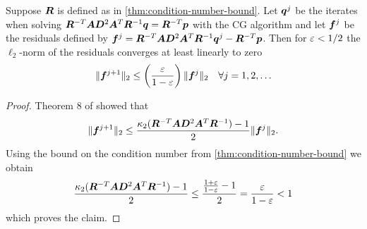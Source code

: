 \begin{theorem} \label{thm:cg-residual-bound}
Suppose \(\bm{R}\) is defined as in \cref{thm:condition-number-bound}.
Let \(\bm{q}^j\) be the iterates when solving \( \bm{R}^{-T} \bm{A} \bm{D}^2 \bm{A}^T \bm{R}^{-1} \bm{q} = \bm{R}^{-T} \bm{p} \) with the CG algorithm and let \(\bm{f}^j\) be the residuals defined by
\( \bm{f}^j = \bm{R}^{-T} \bm{A} \bm{D}^2 \bm{A}^T \bm{R}^{-1} \bm{q}^j - \bm{R}^{-T} \bm{p} \).
Then for \(\varepsilon < 1/2\) the \(\ell_2\)-norm of the residuals converges at least linearly to zero
\[ \lVert \bm{f}^{j+1} \rVert_2 \leq \left( \frac{\varepsilon}{1-\varepsilon} \right) \lVert  \bm{f}^j  \rVert_2 \quad \forall j = 1, 2, \ldots \]
\end{theorem}
\begin{proof}
Theorem 8 of \cite{Bouyouli-ConjugateGradientConvergence} showed that
\[ \lVert \bm{f}^{j+1} \rVert_2 \leq \frac{\kappa_2(\bm{R}^{-T} \bm{A} \bm{D}^2 \bm{A}^T \bm{R}^{-1}) - 1}{2} \lVert \bm{f}^j \rVert_2 .\]
Using the bound on the condition number from \cref{thm:condition-number-bound} we obtain
\[ \frac{\kappa_2(\bm{R}^{-T} \bm{A} \bm{D}^2 \bm{A}^T \bm{R}^{-1}) - 1}{2}
   \leq \frac{\frac{1+\varepsilon}{1-\varepsilon} - 1}{2} = \frac{\varepsilon}{1 - \varepsilon} < 1 \]
which proves the claim.
\end{proof}